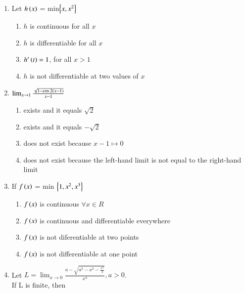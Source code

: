 \documentclass[journal,12pt]{IEEEtran}
\theoremstyle{remark}
\begin{document}
\begin{enumerate}
    \item 
    Let $h\left(x\right)$ = min$\left\{x,x^{2}\right\}$ 

    \hfill 
    {}

    \begin{enumerate}
	\item $h$ is continuous for all $x$
        \item $h$ is differentiable for all $x$
	\item $h^{\prime}\left(t\right)=1$, for all $x >1$
        \item $h$ is not differentiable at two values of $x$
    \end{enumerate}


    \item 
    $\lim_{x \to1}\frac{\sqrt{1-\cos 2\left(x-1\right)}}{x-1}$ 

    \hfill 
    {}
    \begin{enumerate}
        \item exists and it equals $\sqrt{2}$
        \item exists and it equals $-\sqrt{2}$
        \item does not exist because $x-1\mapsto 0$
        \item does not exist because the left-hand limit is not equal to the right-hand limit
    \end{enumerate}


    \item 
    If $f\left(x\right)$ = min $\left\{1,x^2,x^3\right\}$ 

    \hfill 
    {}
    
    \begin{enumerate}
        
        \item $f\left(x\right)$ is continuous $\forall x \in R$
        \item $f\left(x\right)$ is continuous and differentiable everywhere
        \item $f\left(x\right)$ is not diferentiable at two points
        \item $f\left(x\right)$ is not differentiable at one point
    \end{enumerate}


    \item 
    Let $L=\lim_{x \to0}\frac{a-\sqrt{a^2-x^2-\frac{x^2}{4}}}{x^4}, a>0$.\\ If L is finite, then 


\end{enumerate}
\end{document}
